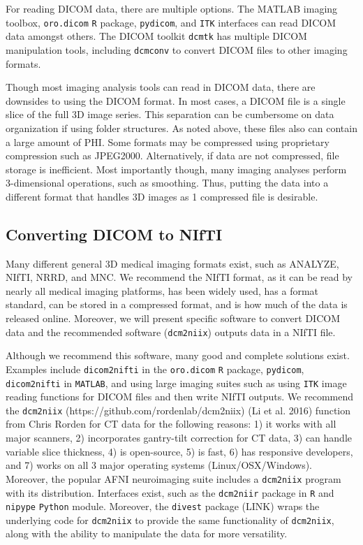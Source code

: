 \documentclass[]{elsarticle} %
\begin{document}
For reading DICOM data, there are multiple options. The MATLAB imaging
toolbox, \texttt{oro.dicom} \texttt{R} package, \texttt{pydicom}, and
\texttt{ITK} interfaces can read DICOM data amongst others. The DICOM
toolkit \texttt{dcmtk} has multiple DICOM manipulation tools, including
\texttt{dcmconv} to convert DICOM files to other imaging formats.

Though most imaging analysis tools can read in DICOM data, there are
downsides to using the DICOM format. In most cases, a DICOM file is a
single slice of the full 3D image series. This separation can be
cumbersome on data organization if using folder structures. As noted
above, these files also can contain a large amount of PHI. Some formats
may be compressed using proprietary compression such as JPEG2000.
Alternatively, if data are not compressed, file storage is inefficient.
Most importantly though, many imaging analyses perform 3-dimensional
operations, such as smoothing. Thus, putting the data into a different
format that handles 3D images as 1 compressed file is desirable.

\hypertarget{converting-dicom-to-nifti}{%
\subsection{Converting DICOM to NIfTI}\label{converting-dicom-to-nifti}}

Many different general 3D medical imaging formats exist, such as
ANALYZE, NIfTI, NRRD, and MNC. We recommend the NIfTI format, as it can
be read by nearly all medical imaging platforms, has been widely used,
has a format standard, can be stored in a compressed format, and is how
much of the data is released online. Moreover, we will present specific
software to convert DICOM data and the recommended software
(\texttt{dcm2niix}) outputs data in a NIfTI file.

Although we recommend this software, many good and complete solutions
exist. Examples include \texttt{dicom2nifti} in the \texttt{oro.dicom}
\texttt{R} package, \texttt{pydicom}, \texttt{dicom2nifti} in
\texttt{MATLAB}, and using large imaging suites such as using
\texttt{ITK} image reading functions for DICOM files and then write
NIfTI outputs. We recommend the \texttt{dcm2niix}
(https://github.com/rordenlab/dcm2niix) (Li et al. 2016) function from
Chris Rorden for CT data for the following reasons: 1) it works with all
major scanners, 2) incorporates gantry-tilt correction for CT data, 3)
can handle variable slice thickness, 4) is open-source, 5) is fast, 6)
has responsive developers, and 7) works on all 3 major operating systems
(Linux/OSX/Windows). Moreover, the popular AFNI neuroimaging suite
includes a \texttt{dcm2niix} program with its distribution. Interfaces
exist, such as the \texttt{dcm2niir} package in \texttt{R} and
\texttt{nipype} \texttt{Python} module. Moreover, the \texttt{divest}
package (LINK) wraps the underlying code for \texttt{dcm2niix} to
provide the same functionality of \texttt{dcm2niix}, along with the
ability to manipulate the data for more versatility.
\end{document}

